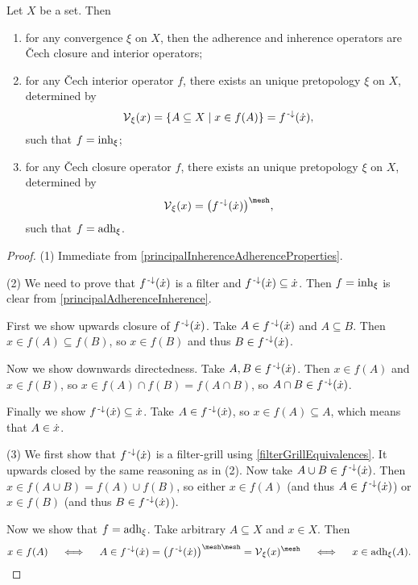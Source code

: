 \begin{proposition} \label{CechClosureInteriorPretopology}
Let $X$ be a set. Then
\begin{enumerate}
\item for any convergence $\xi$ on $X$, then the adherence and inherence operators are Čech closure and interior operators;
\item for any Čech interior operator $f$, there exists an unique pretopology $\xi$ on $X$, determined by
\[ \vicinities_\xi(x) = \setbuilder{A\subseteq X}{x\in f(A)} = f^{\preimf}(\pfilter{x}), \]
such that $f = \operatorname{inh}_\xi$;
\item for any Čech closure operator $f$, there exists an unique pretopology $\xi$ on $X$, determined by
\[ \vicinities_\xi(x) = \big(f^\preimf(\pfilter{x})\big)^\mesh, \]
such that $f = \operatorname{adh}_\xi$.
\end{enumerate}
\end{proposition}
\begin{proof}
(1) Immediate from \ref{principalInherenceAdherenceProperties}.

(2) We need to prove that $f^{{\text{\hspace{0.15em}-}\downarrow}}(\dot{x})$ is a filter and $f^{{\text{\hspace{0.15em}-}\downarrow}}(\dot{x})\subseteq \dot{x}$. Then $f = \operatorname{inh}_\xi$ is clear from \ref{principalAdherenceInherence}.

First we show upwards closure of $f^{{\text{\hspace{0.15em}-}\downarrow}}(\dot{x})$. Take $A\in f^{{\text{\hspace{0.15em}-}\downarrow}}(\dot{x})$ and $A\subseteq B$. Then $x\in f(A)\subseteq f(B)$, so $x\in f(B)$ and thus $B\in f^{{\text{\hspace{0.15em}-}\downarrow}}(\dot{x})$.

Now we show downwards directedness. Take $A,B\in f^{{\text{\hspace{0.15em}-}\downarrow}}(\dot{x})$. Then $x\in f(A)$ and $x\in f(B)$, so $x\in f(A)\cap f(B) = f(A\cap B)$, so $A\cap B\in f^{{\text{\hspace{0.15em}-}\downarrow}}(\dot{x})$.

Finally we show $f^{{\text{\hspace{0.15em}-}\downarrow}}(\dot{x})\subseteq \dot{x}$. Take $A\in f^{{\text{\hspace{0.15em}-}\downarrow}}(\dot{x})$, so $x\in f(A)\subseteq A$, which means that $A\in \dot{x}$.

(3) We first show that $f^{\text{\hspace{0.15em}-}\downarrow}(\dot{x})$ is a filter-grill using \ref{filterGrillEquivalences}. It upwards closed by the same reasoning as in (2). Now take $A\cup B\in f^{\text{\hspace{0.15em}-}\downarrow}(\dot{x})$. Then $x\in f(A\cup B) = f(A) \cup f(B)$, so either $x\in f(A)$ (and thus $A\in f^{\text{\hspace{0.15em}-}\downarrow}(\dot{x})$) or $x\in f(B)$ (and thus $B\in f^{\text{\hspace{0.15em}-}\downarrow}(\dot{x})$).

Now we show that $f = \operatorname{adh}_\xi$. Take arbitrary $A\subseteq X$ and $x\in X$. Then
\[ x\in f(A) \quad\iff\quad A\in f^\preimf(\pfilter{x}) = \big(f^\preimf(\pfilter{x})\big)^{\mesh\mesh} = \vicinities_\xi(x)^\mesh \quad\iff\quad x\in \adh_\xi(A). \]
\end{proof}

